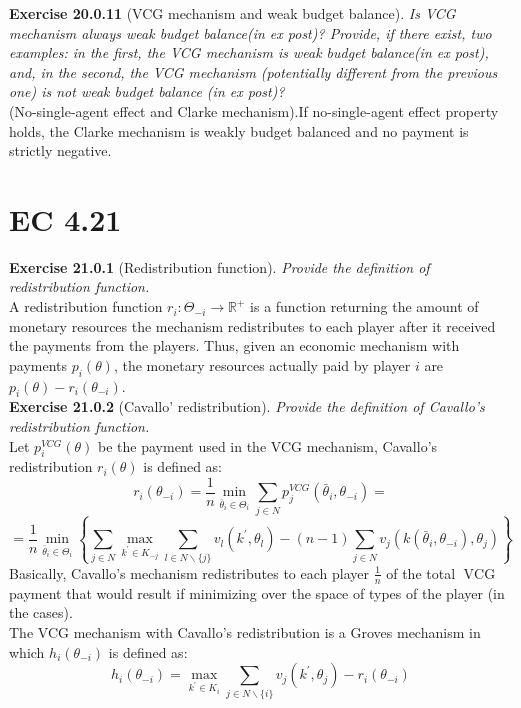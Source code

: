 \textbf{Exercise 20.0.11} (VCG mechanism and weak budget balance). \textit{Is VCG mechanism always weak budget balance(in ex post)? Provide, if there exist, two examples: in the first, the VCG mechanism is weak budget balance(in ex post), and, in the second, the VCG mechanism (potentially different from the previous one) is not weak budget balance (in ex post)?}\\

(No-single-agent effect and Clarke mechanism).If no-single-agent effect property holds, the Clarke mechanism is weakly budget balanced and no payment is strictly negative.

\section{EC 4.21}

\textbf{Exercise 21.0.1} (Redistribution function). \textit{Provide the definition of redistribution function.}\\

A redistribution function $r_i: \Theta_{-i} \rightarrow \mathbb{R}^{+}$ is a function returning the amount of monetary resources the mechanism redistributes to each player after it received the payments from the players. Thus, given an economic mechanism with payments $p_i(\theta)$, the monetary resources actually paid by player $i$ are $p_i (\theta) - r_i (\theta_{-i})$.\\

\textbf{Exercise 21.0.2} (Cavallo’ redistribution). \textit{Provide the definition of Cavallo’s redistribution function.}\\

Let $p_{i}^{V C G}(\theta)$ be the payment used in the VCG mechanism, Cavallo's redistribution $r_{i}(\theta)$ is defined as:
$$
r_{i}\left(\theta_{-i}\right)=\frac{1}{n} \min _{\bar{\theta}_{i} \in \Theta_{i}} \sum_{j \in N} p_{j}^{V C G}\left(\bar{\theta}_{i}, \theta_{-i}\right)=
$$
$$=\frac{1}{n} \min _{\bar{\theta}_{i} \in \Theta_{i}}\left\{\sum_{j \in N} \max _{k^{\prime} \in K_{-j}} \sum_{l \in N \backslash\{j\}} v_{l}\left(k^{\prime}, \theta_{l}\right)-(n-1) \sum_{j \in N} v_{j}\left(k\left(\bar{\theta}_{i}, \theta_{-i}\right), \theta_{j}\right)\right\}
$$
Basically, Cavallo's mechanism redistributes to each player $\frac{1}{n}$ of the total $\operatorname{VCG}$ payment that would result if minimizing over the space of types of the player (in the cases).\\
The VCG mechanism with Cavallo's redistribution is a Groves mechanism in which $h_{i}\left(\theta_{-i}\right)$ is defined as:
$$
h_{i}\left(\theta_{-i}\right)=\max _{k^{\prime} \in K_{i}} \sum_{j \in N \backslash\{i\}} v_{j}\left(k^{\prime}, \theta_{j}\right)-r_{i}\left(\theta_{-i}\right)
$$

